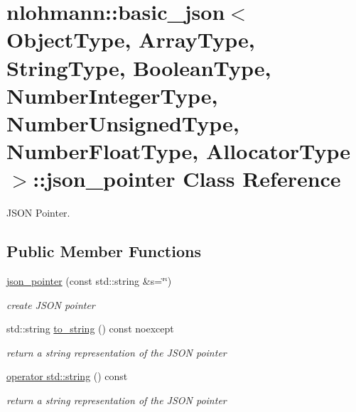 \hypertarget{classnlohmann_1_1basic__json_1_1json__pointer}{}\section{nlohmann\+:\+:basic\+\_\+json$<$ Object\+Type, Array\+Type, String\+Type, Boolean\+Type, Number\+Integer\+Type, Number\+Unsigned\+Type, Number\+Float\+Type, Allocator\+Type $>$\+:\+:json\+\_\+pointer Class Reference}
\label{classnlohmann_1_1basic__json_1_1json__pointer}


J\+S\+O\+N Pointer.  


\subsection*{Public Member Functions}
\begin{DoxyCompactItemize}
\item 
\hyperlink{classnlohmann_1_1basic__json_1_1json__pointer_ae12db117a2742d826465080979d7c835}{json\+\_\+pointer} (const std\+::string \&s=\char`\"{}\char`\"{})
\begin{DoxyCompactList}\small\item\em create J\+S\+O\+N pointer \end{DoxyCompactList}\item 
std\+::string \hyperlink{classnlohmann_1_1basic__json_1_1json__pointer_a14fda25789660bdc3f2de652fec35f61}{to\+\_\+string} () const  noexcept
\begin{DoxyCompactList}\small\item\em return a string representation of the J\+S\+O\+N pointer \end{DoxyCompactList}\item 
\hyperlink{classnlohmann_1_1basic__json_1_1json__pointer_a344b49c70c83ff591be767072c87336e}{operator std\+::string} () const 
\begin{DoxyCompactList}\small\item\em return a string representation of the J\+S\+O\+N pointer \end{DoxyCompactList}\end{DoxyCompactItemize}
